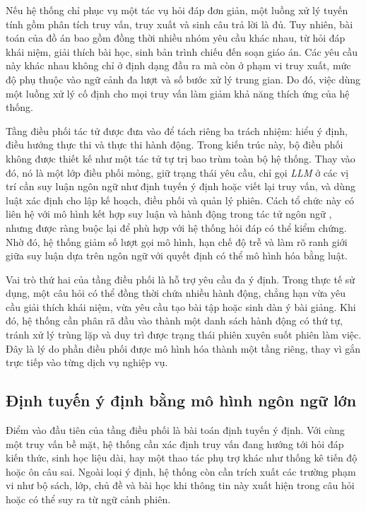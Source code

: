 \documentclass[../DoAn.tex]{subfiles}
\begin{document}
Nếu hệ thống chỉ phục vụ một tác vụ hỏi đáp đơn giản, một luồng xử lý tuyến tính gồm phân tích truy vấn, truy xuất và sinh câu trả lời là đủ. Tuy nhiên, bài toán của đồ án bao gồm đồng thời nhiều nhóm yêu cầu khác nhau, từ hỏi đáp khái niệm, giải thích bài học, sinh bản trình chiếu đến soạn giáo án. Các yêu cầu này khác nhau không chỉ ở định dạng đầu ra mà còn ở phạm vi truy xuất, mức độ phụ thuộc vào ngữ cảnh đa lượt và số bước xử lý trung gian. Do đó, việc dùng một luồng xử lý cố định cho mọi truy vấn làm giảm khả năng thích ứng của hệ thống.

Tầng điều phối tác tử được đưa vào để tách riêng ba trách nhiệm: hiểu ý định, điều hướng thực thi và thực thi hành động. Trong kiến trúc này, bộ điều phối không được thiết kế như một tác tử tự trị bao trùm toàn bộ hệ thống. Thay vào đó, nó là một lớp điều phối mỏng, giữ trạng thái yêu cầu, chỉ gọi \textit{LLM} ở các vị trí cần suy luận ngôn ngữ như định tuyến ý định hoặc viết lại truy vấn, và dùng luật xác định cho lập kế hoạch, điều phối và quản lý phiên. Cách tổ chức này có liên hệ với mô hình kết hợp suy luận và hành động trong tác tử ngôn ngữ \cite{yao2022react}, nhưng được ràng buộc lại để phù hợp với hệ thống hỏi đáp có thể kiểm chứng. Nhờ đó, hệ thống giảm số lượt gọi mô hình, hạn chế độ trễ và làm rõ ranh giới giữa suy luận dựa trên ngôn ngữ với quyết định có thể mô hình hóa bằng luật.

Vai trò thứ hai của tầng điều phối là hỗ trợ yêu cầu đa ý định. Trong thực tế sử dụng, một câu hỏi có thể đồng thời chứa nhiều hành động, chẳng hạn vừa yêu cầu giải thích khái niệm, vừa yêu cầu tạo bài tập hoặc sinh dàn ý bài giảng. Khi đó, hệ thống cần phân rã đầu vào thành một danh sách hành động có thứ tự, tránh xử lý trùng lặp và duy trì được trạng thái phiên xuyên suốt phiên làm việc. Đây là lý do phần điều phối được mô hình hóa thành một tầng riêng, thay vì gắn trực tiếp vào từng dịch vụ nghiệp vụ.

\subsection{Định tuyến ý định bằng mô hình ngôn ngữ lớn}

Điểm vào đầu tiên của tầng điều phối là bài toán định tuyến ý định. Với cùng một truy vấn bề mặt, hệ thống cần xác định truy vấn đang hướng tới hỏi đáp kiến thức, sinh học liệu dài, hay một thao tác phụ trợ khác như thống kê tiến độ hoặc ôn câu sai. Ngoài loại ý định, hệ thống còn cần trích xuất các trường phạm vi như bộ sách, lớp, chủ đề và bài học khi thông tin này xuất hiện trong câu hỏi hoặc có thể suy ra từ ngữ cảnh phiên.
\end{document}
